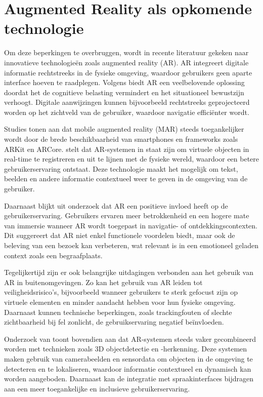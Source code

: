 \section{Augmented Reality als opkomende technologie}

Om deze beperkingen te overbruggen, wordt in recente literatuur gekeken naar innovatieve technologieën zoals augmented reality (AR). AR integreert digitale informatie rechtstreeks in de fysieke omgeving, waardoor gebruikers geen aparte interface hoeven te raadplegen. Volgens \autocite{Zhao2025} biedt AR een veelbelovende oplossing doordat het de cognitieve belasting vermindert en het situationeel bewustzijn verhoogt. Digitale aanwijzingen kunnen bijvoorbeeld rechtstreeks geprojecteerd worden op het zichtveld van de gebruiker, waardoor navigatie efficiënter wordt.

Studies tonen aan dat mobile augmented reality (MAR) steeds toegankelijker wordt door de brede beschikbaarheid van smartphones en frameworks zoals ARKit en ARCore. \autocite{Xu2018} stelt dat AR-systemen in staat zijn om virtuele objecten in real-time te registreren en uit te lijnen met de fysieke wereld, waardoor een betere gebruikerservaring ontstaat. Deze technologie maakt het mogelijk om tekst, beelden en andere informatie contextueel weer te geven in de omgeving van de gebruiker.

Daarnaast blijkt uit onderzoek dat AR een positieve invloed heeft op de gebruikerservaring. Gebruikers ervaren meer betrokkenheid en een hogere mate van immersie wanneer AR wordt toegepast in navigatie- of ontdekkingscontexten. Dit suggereert dat AR niet enkel functionele voordelen biedt, maar ook de beleving van een bezoek kan verbeteren, wat relevant is in een emotioneel geladen context zoals een begraafplaats.

Tegelijkertijd zijn er ook belangrijke uitdagingen verbonden aan het gebruik van AR in buitenomgevingen. Zo kan het gebruik van AR leiden tot veiligheidsrisico’s, bijvoorbeeld wanneer gebruikers te sterk gefocust zijn op virtuele elementen en minder aandacht hebben voor hun fysieke omgeving. Daarnaast kunnen technische beperkingen, zoals trackingfouten of slechte zichtbaarheid bij fel zonlicht, de gebruikservaring negatief beïnvloeden.

Onderzoek van \autocite{Chen2022} toont bovendien aan dat AR-systemen steeds vaker gecombineerd worden met technieken zoals 3D objectdetectie en -herkenning. Deze systemen maken gebruik van camerabeelden en sensordata om objecten in de omgeving te detecteren en te lokaliseren, waardoor informatie contextueel en dynamisch kan worden aangeboden. Daarnaast kan de integratie met spraakinterfaces bijdragen aan een meer toegankelijke en inclusieve gebruikerservaring.

